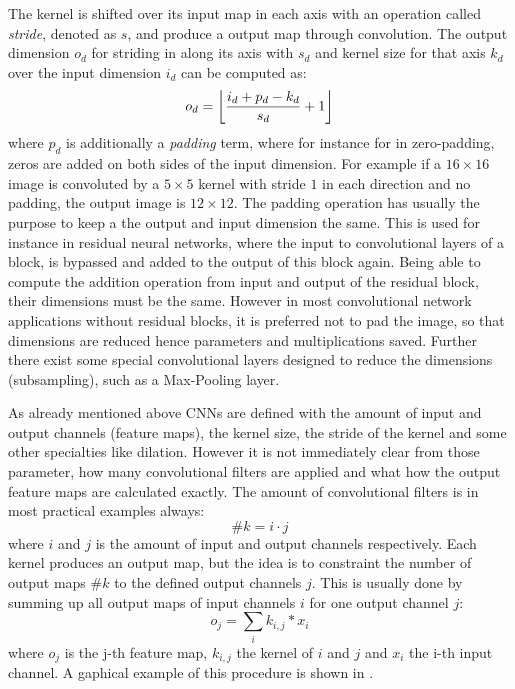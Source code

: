 The kernel is shifted over its input map in each axis with an operation called \emph{stride}, denoted as $s$, and produce a output map through convolution.
The output dimension $o_d$ for striding in along its axis with $s_d$ and kernel size for that axis $k_d$ over the input dimension $i_d$ can be computed as:
\begin{equation}\label{eq:nn_theory_cnn_}
  o_d = \floor*{\frac{i_d + p_d - k_d}{s_d} + 1}
\end{equation}
where $p_d$ is additionally a \emph{padding} term, where for instance for in zero-padding, zeros are added on both sides of the input dimension.
For example if a $16 \times 16$ image is convoluted by a $5 \times 5$ kernel with stride $1$ in each direction and no padding, the output image is $12 \times 12$.
The padding operation has usually the purpose to keep a the output and input dimension the same.
This is used for instance in residual neural networks, where the input to convolutional layers of a block, is bypassed and added to the output of this block again.
Being able to compute the addition operation from input and output of the residual block, their dimensions must be the same.
However in most convolutional network applications without residual blocks, it is preferred not to pad the image, so that dimensions are reduced hence parameters and multiplications saved.
Further there exist some special convolutional layers designed to reduce the dimensions (subsampling), such as a Max-Pooling layer. 

As already mentioned above CNNs are defined with the amount of input and output channels (feature maps), the kernel size, the stride of the kernel and some other specialties like dilation.
However it is not immediately clear from those parameter, how many convolutional filters are applied and what how the output feature maps are calculated exactly.
The amount of convolutional filters is in most practical examples always:
\begin{equation}\label{eq:nn_theory_n_filters}
  \#k = i \cdot j
\end{equation}
where $i$ and $j$ is the amount of input and output channels respectively.
Each kernel produces an output map, but the idea is to constraint the number of output maps $\#k$ to the defined output channels $j$.
This is usually done by summing up all output maps of input channels $i$ for one output channel $j$:
\begin{equation}
  o_j = \sum_{i} k_{i, j} * x_i
\end{equation}
where $o_j$ is the j-th feature map, $k_{i, j}$ the kernel of $i$ and $j$ and $x_i$ the i-th input channel.
A gaphical example of this procedure is shown in .

